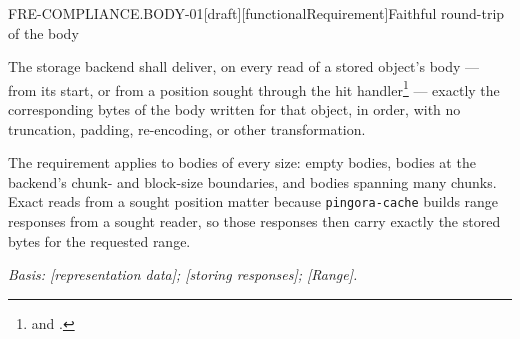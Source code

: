 \begin{requirement}{FRE-COMPLIANCE.BODY-01}[draft][functionalRequirement]{Faithful round-trip of the body}


  The storage backend shall deliver, on every read of a stored object's body
  --- from its start, or from a position sought through the hit
  handler\footnote{
  and .}
  --- exactly the corresponding bytes of the body written for that object, in
  order, with no truncation, padding, re-encoding, or other transformation.

  The requirement applies to bodies of every size: empty bodies, bodies at the
  backend's chunk- and block-size boundaries, and bodies spanning many chunks.
  Exact reads from a sought position matter because \texttt{pingora-cache}
  builds range responses from a sought reader, so those responses then carry
  exactly the stored bytes for the requested range.

  \textit{Basis: [representation data];
  [storing responses]; [Range].}



\end{requirement}

